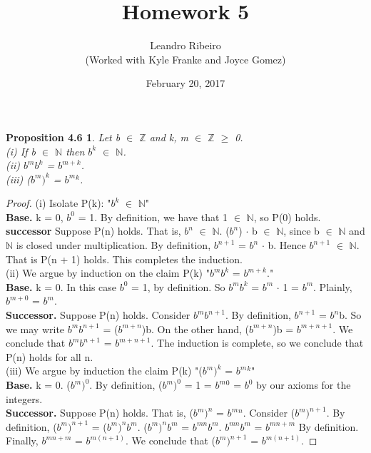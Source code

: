 \documentclass[12pt]{amsart}
\newcommand{\N}{\mathbb{N}}
\newcommand{\Z}{\mathbb{Z}}
\begin{document}
\title{Homework 5}
\date{February 20, 2017}
\author{Leandro Ribeiro\\(Worked with Kyle Franke and Joyce Gomez)}

\maketitle

\newtheorem*{prop4.6}{Proposition 4.6}
\begin{prop4.6}
	Let b $\in$ $\Z$ and k, m $\in$ $\Z$ $\geq$ 0.
	\\(i) If b $\in$ $\N$ then $b^k$ $\in$ $\N$.
	\\(ii) $b^m$$b^k$ = $b^{m + k}$.
	\\(iii) ($b^m$$)^k$ = $b^m$$^k$.
\end{prop4.6}

\begin{proof}
	(i) Isolate P(k): "$b^k$ $\in$ $\N$"
	\\\textbf{Base.} k = 0, $b^0$ = 1. By definition, we have that 1 $\in$ $\N$, so P(0) holds.
	\\\textbf{successor} Suppose P(n) holds. That is, $b^n$ $\in$ $\N$. ($b^n$) $\cdot$ b $\in$ $\N$, since b $\in$ $\N$ and $\N$ is closed under multiplication. By definition, $b^{n + 1}$ = $b^n$ $\cdot$ b. Hence $b^{n + 1}$ $\in$ $\N$. That is P(n + 1) holds. This completes the induction.
	\\\indent (ii) We argue by induction on the claim P(k) "$b^m$$b^k$ = $b^{m + k}$."
	\\\textbf{Base.} k = 0. In this case $b^0$ = 1, by definition. So $b^m$$b^k$ = $b^m$ $\cdot$ 1 = $b^m$. Plainly, $b^{m + 0}$ = $b^m$.
	\\\textbf{Successor.} Suppose P(n) holds. Consider $b^m$$b^{n + 1}$. By definition, $b^{n + 1}$ = $b^n$b. So we may write $b^m$$b^{n + 1}$ = ($b^{m + n}$)b. On the other hand, ($b^{m + n}$)b = $b^{m + n + 1}$. We conclude that $b^m$$b^{n + 1}$ = $b^{m + n + 1}$. The induction is complete, so we conclude that P(n) holds for all n.
	\\\indent (iii) We argue by induction the claim P(k) "($b^m$$)^k$ = $b^m$$^k$"
	\\\textbf{Base.} k = 0. ($b^m$$)^0$. By definition, ($b^m$$)^0$ = 1 = $b^m$$^0$ = $b^0$ by our axioms for the integers.
	\\\textbf{Successor.} Suppose P(n) holds. That is, ($b^m$$)^n$ = $b^m$$^n$. Consider ($b^m$$)^{n + 1}$. By definition, ($b^m$$)^{n + 1}$ = ($b^m$$)^{n}$$b^m$. ($b^m$$)^{n}$$b^m$ = $b^{mn}$$b^m$. $b^{mn}$$b^m$ = $b^{mn + m}$ By definition. Finally, $b^{mn + m}$ = $b^{m(n + 1)}$. We conclude that ($b^m$$)^{n + 1}$ = $b^{m(n + 1)}$.
\end{proof}
\end{document}
